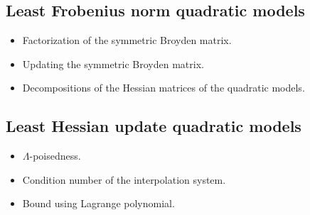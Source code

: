 \subsection{Least Frobenius norm quadratic models}

\begin{itemize}
    \item Factorization of the symmetric Broyden matrix.
    \item Updating the symmetric Broyden matrix.
    \item Decompositions of the Hessian matrices of the quadratic models.
\end{itemize}

\subsection{Least Hessian update quadratic models}

\begin{itemize}
    \item $\Lambda$-poisedness.     
    \item Condition number of the interpolation system.
    \item Bound using Lagrange polynomial.
\end{itemize}
